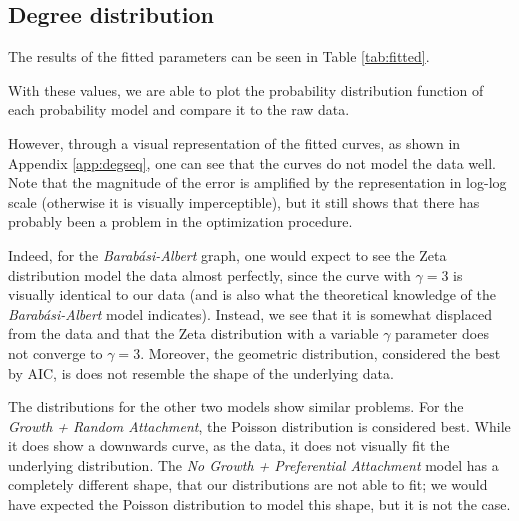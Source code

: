 \subsection{Degree distribution}

The results of the fitted parameters can be seen in Table \ref{tab:fitted}.



With these values, we are able to plot the probability distribution function of each probability model and compare it to the raw data.

However, through a visual representation of the fitted curves, as shown in Appendix \ref{app:degseq}, one can see that the curves do not model the data well. Note that the magnitude of the error is amplified by the representation in log-log scale (otherwise it is visually imperceptible), but it still shows that there has probably been a problem in the optimization procedure.

Indeed, for the \textit{Barabási-Albert} graph, one would expect to see the Zeta distribution model the data almost perfectly, since the curve with $\gamma = 3$ is visually identical to our data (and is also what the theoretical knowledge of the \textit{Barabási-Albert} model indicates). Instead, we see that it is somewhat displaced from the data and that the Zeta distribution with a variable $\gamma$ parameter does not converge to $\gamma=3$. Moreover, the geometric distribution, considered the best by AIC, is does not resemble the shape of the underlying data.

The distributions for the other two models show similar problems. For the \textit{Growth + Random Attachment}, the Poisson distribution is considered best. While it does show a downwards curve, as the data, it does not visually fit the underlying distribution. The \textit{No Growth + Preferential Attachment} model has a completely different shape, that our distributions are not able to fit; we would have expected the Poisson distribution to model this shape, but it is not the case.